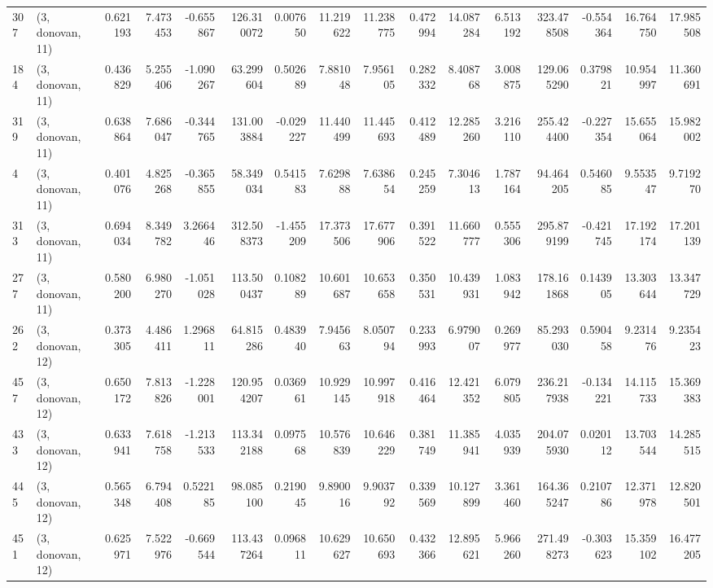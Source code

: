 \begin{tabular}{llrrrrrrrrrrrrrr}
307 &  (3, donovan, 11) &   0.621193 &   7.473453 &  -0.655867 &   126.310072 &   0.007650 &  11.219622 &  11.238775 &  0.472994 &  14.087284 &   6.513192 &    323.478508 &   -0.554364 &   16.764750 &   17.985508 \\
184 &  (3, donovan, 11) &   0.436829 &   5.255406 &  -1.090267 &    63.299604 &   0.502689 &   7.881048 &   7.956105 &  0.282332 &   8.408768 &   3.008875 &    129.065290 &    0.379821 &   10.954997 &   11.360691 \\
319 &  (3, donovan, 11) &   0.638864 &   7.686047 &  -0.344765 &   131.003884 &  -0.029227 &  11.440499 &  11.445693 &  0.412489 &  12.285260 &   3.216110 &    255.424400 &   -0.227354 &   15.655064 &   15.982002 \\
4   &  (3, donovan, 11) &   0.401076 &   4.825268 &  -0.365855 &    58.349034 &   0.541583 &   7.629888 &   7.638654 &  0.245259 &   7.304613 &   1.787164 &     94.464205 &    0.546085 &    9.553547 &    9.719270 \\
313 &  (3, donovan, 11) &   0.694034 &   8.349782 &   3.266446 &   312.508373 &  -1.455209 &  17.373506 &  17.677906 &  0.391522 &  11.660777 &   0.555306 &    295.879199 &   -0.421745 &   17.192174 &   17.201139 \\
277 &  (3, donovan, 11) &   0.580200 &   6.980270 &  -1.051028 &   113.500437 &   0.108289 &  10.601687 &  10.653658 &  0.350531 &  10.439931 &   1.083942 &    178.161868 &    0.143905 &   13.303644 &   13.347729 \\
262 &  (3, donovan, 12) &   0.373305 &   4.486411 &   1.296811 &    64.815286 &   0.483940 &   7.945663 &   8.050794 &  0.233993 &   6.979007 &   0.269977 &     85.293030 &    0.590458 &    9.231476 &    9.235423 \\
457 &  (3, donovan, 12) &   0.650172 &   7.813826 &  -1.228001 &   120.954207 &   0.036961 &  10.929145 &  10.997918 &  0.416464 &  12.421352 &   6.079805 &    236.217938 &   -0.134221 &   14.115733 &   15.369383 \\
433 &  (3, donovan, 12) &   0.633941 &   7.618758 &  -1.213533 &   113.342188 &   0.097568 &  10.576839 &  10.646229 &  0.381749 &  11.385941 &   4.035939 &    204.075930 &    0.020112 &   13.703544 &   14.285515 \\
445 &  (3, donovan, 12) &   0.565348 &   6.794408 &   0.522185 &    98.085100 &   0.219045 &   9.890016 &   9.903792 &  0.339569 &  10.127899 &   3.361460 &    164.365247 &    0.210786 &   12.371978 &   12.820501 \\
451 &  (3, donovan, 12) &   0.625971 &   7.522976 &  -0.669544 &   113.437264 &   0.096811 &  10.629627 &  10.650693 &  0.432366 &  12.895621 &   5.966260 &    271.498273 &   -0.303623 &   15.359102 &   16.477205 \\

\end{tabular}
